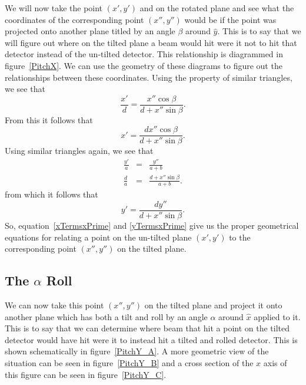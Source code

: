 We will now take the point $(x',y')$ and on the rotated plane 
and see what the coordinates of the corresponding point
$(x'',y'')$ would be if the point was projected onto another
plane titled by an angle $\beta$ around $\hat{y}$.
This is to say that we will figure out where on the tilted
plane a beam would hit were it not to hit that detector 
instead of the un-tilted detector.
This relationship is diagrammed in figure~\ref{PitchX}.  
We can use the geometry of these diagrams to figure out
the relationships between these coordinates. Using
the property of similar triangles, we see that
\begin{equation}
    \frac{x'}{d}=\frac{x''\cos\beta}{d+x''\sin\beta}.
\end{equation}
From this it follows that 
\begin{equation}\label{xTermsxPrime}
    \boxed{x' = \frac{dx''\cos\beta}{d+x''\sin\beta}.}
\end{equation}
Using similar triangles again, we see that
\begin{eqnarray}
    \frac{y'}{a}&=&\frac{y''}{a+b}\\
    \frac{d}{a}&=&\frac{d+x''\sin\beta}{a+b}.
\end{eqnarray}
from which it follows that
\begin{equation}\label{yTermsxPrime}
	\boxed{y'= \frac{dy''}{d+x''\sin\beta}.}
\end{equation}
So, equation~\ref{xTermsxPrime} and \ref{yTermsxPrime} give us 
the proper geometrical equations for relating a point on the 
un-tilted plane $(x',y')$ to the corresponding point 
$(x'',y'')$ on the tilted plane.


\subsection{The $\alpha$ Roll}
We can now take this point $(x'',y'')$ on the tilted 
plane and project it onto another plane which has both 
a tilt and roll by an angle $\alpha$ around $\hat{x}$ 
applied to it. This is to say that we can determine 
where beam that hit a point on the tilted detector 
would have hit were it to instead hit a tilted and 
rolled detector. This is shown schematically in 
figure~\ref{PitchY_A}. A more geometric view of 
the situation can be seen in figure~\ref{PitchY_B} and 
a cross section of the $x$
axis of this figure can be seen in figure~\ref{PitchY_C}.

\begin{SCfigure}
\centering
 
\label{PitchY_A}
\caption{In this figure, we see a tilted detector 
and then a detector which is both tilted and rolled
by an angle $\alpha$ around $\hat{x}$.}
\end{SCfigure}

